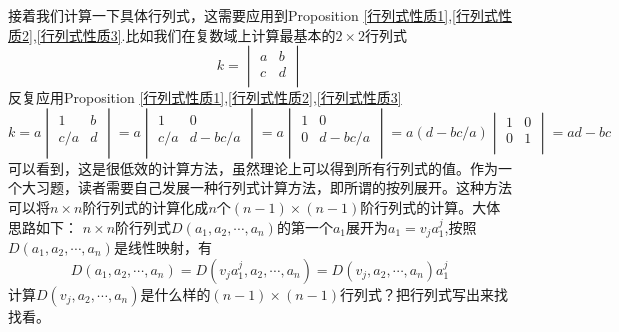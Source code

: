 \documentclass[11pt,a4paper,openany]{book}%
\theoremstyle{plain}%
\begin{document}
\indent 接着我们计算一下具体行列式，这需要应用到Proposition \ref{行列式性质1},\ref{行列式性质2},\ref{行列式性质3}.比如我们在复数域上计算最基本的$2\times 2$行列式
\[
k=\begin{vmatrix}
a & b\\
c & d\\
\end{vmatrix}
\]
反复应用Proposition \ref{行列式性质1},\ref{行列式性质2},\ref{行列式性质3}
\[
k=a\begin{vmatrix}
1 & b\\
c/a & d\\
\end{vmatrix}
=a\begin{vmatrix}
1 & 0\\
c/a & d-bc/a\\
\end{vmatrix}
=a\begin{vmatrix}
1 & 0\\
0 & d-bc/a\\
\end{vmatrix}
=a(d-bc/a)\begin{vmatrix}
1 & 0\\
0 & 1\\
\end{vmatrix}
=ad-bc
\]
可以看到，这是很低效的计算方法，虽然理论上可以得到所有行列式的值。作为一个大习题，读者需要自己发展一种行列式计算方法，即所谓的按列展开。这种方法可以将$n\times n$阶行列式的计算化成$n$个$(n-1)\times (n-1)$阶行列式的计算。大体思路如下：
$n\times n$阶行列式$D(a_1,a_2,\cdots,a_n)$的第一个$a_1$展开为$a_1=v_ja_1^j$,按照$D(a_1,a_2,\cdots,a_n)$是线性映射，有
\[
D(a_1,a_2,\cdots,a_n)=D(v_ja_1^j,a_2,\cdots,a_n)=D(v_j,a_2,\cdots,a_n)a_1^j
\]
计算$D(v_j,a_2,\cdots,a_n)$是什么样的$(n-1)\times (n-1)$行列式？把行列式写出来找找看。
\end{document}
